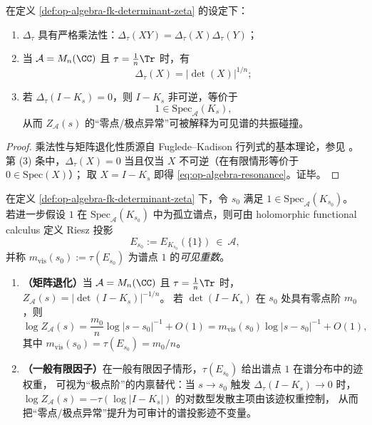 \begin{proposition}\label{prop:op-algebra-fkdet-properties}
在定义 \ref{def:op-algebra-fk-determinant-zeta} 的设定下：
\begin{enumerate}
  \item \(\Delta_\tau\) 具有严格乘法性：\(\Delta_\tau(XY)=\Delta_\tau(X)\Delta_\tau(Y)\)；
  \item 当 \(\mathcal{A}=M_n(\CC)\) 且 \(\tau=\frac{1}{n}\Tr\) 时，有
  \[
  \Delta_\tau(X)=|\det(X)|^{1/n};
  \]
  \item 若 \(\Delta_\tau(I-K_s)=0\)，则 \(I-K_s\) 非可逆，等价于
  \begin{equation}\label{eq:op-algebra-resonance}
  \boxed{\;1\in\mathrm{Spec}_{\mathcal{A}}(K_s),\;}
  \end{equation}
  从而 \(Z_{\mathcal{A}}(s)\) 的“零点/极点异常”可被解释为可见谱的共振碰撞。
\end{enumerate}
\end{proposition}

\begin{proof}
乘法性与矩阵退化性质源自 Fuglede--Kadison 行列式的基本理论，参见 \cite{FugledeKadison1951DeterminantsTraceFiniteFactors}。
第 (3) 条中，\(\Delta_\tau(X)=0\) 当且仅当 \(X\) 不可逆（在有限情形等价于 \(0\in\mathrm{Spec}(X)\)）；
取 \(X=I-K_s\) 即得 \eqref{eq:op-algebra-resonance}。证毕。
\end{proof}

\begin{remark}\label{rem:op-algebra-nc-zeta-visible-multiplicity}
在定义 \ref{def:op-algebra-fk-determinant-zeta} 下，令 \(s_0\) 满足 \(1\in\mathrm{Spec}_{\mathcal{A}}(K_{s_0})\)。
若进一步假设 \(1\) 在 \(\mathrm{Spec}_{\mathcal{A}}(K_{s_0})\) 中为孤立谱点，则可由 holomorphic functional calculus 定义 Riesz 投影
\[
E_{s_0}:=E_{K_{s_0}}(\{1\})\ \in\ \mathcal{A},
\]
并称
\(
m_{\mathrm{vis}}(s_0):=\tau(E_{s_0})
\)
为谱点 \(1\) 的\emph{可见重数}。
\begin{enumerate}
  \item \textbf{（矩阵退化）}当 \(\mathcal{A}=M_n(\CC)\) 且 \(\tau=\frac{1}{n}\Tr\) 时，
  \(Z_{\mathcal{A}}(s)=|\det(I-K_s)|^{-1/n}\)。
  若 \(\det(I-K_s)\) 在 \(s_0\) 处具有零点阶 \(m_0\)，则
  \[
  \log Z_{\mathcal{A}}(s)
  =\frac{m_0}{n}\log|s-s_0|^{-1}+O(1)
  =m_{\mathrm{vis}}(s_0)\log|s-s_0|^{-1}+O(1),
  \]
  其中 \(m_{\mathrm{vis}}(s_0)=\tau(E_{s_0})=m_0/n\)。
  \item \textbf{（一般有限因子）}在一般有限因子情形，\(\tau(E_{s_0})\) 给出谱点 \(1\) 在谱分布中的迹权重，
  可视为“极点阶”的内禀替代：当 \(s\to s_0\) 触发 \(\Delta_\tau(I-K_s)\to 0\) 时，
  \(\log Z_{\mathcal{A}}(s)=-\tau(\log|I-K_s|)\) 的对数型发散主项由该迹权重控制，
  从而把“零点/极点异常”提升为可审计的谱投影迹不变量。
\end{enumerate}
\end{remark}

